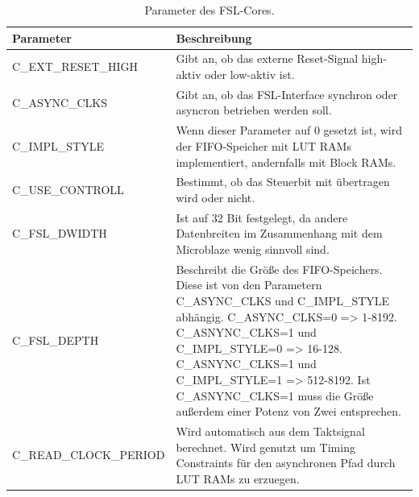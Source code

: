 \begin{table}[ht!]
	\begin{tabular}{|l|p{10cm}|}
		\hline \textbf{Parameter} & \textbf{Beschreibung} \\ 
		\hline C\_EXT\_RESET\_HIGH & Gibt an, ob das externe Reset-Signal high-aktiv oder low-aktiv ist.\\ 
		\hline C\_ASYNC\_CLKS & Gibt an, ob das FSL-Interface synchron oder asyncron betrieben werden soll.\\ 
		\hline C\_IMPL\_STYLE & Wenn dieser Parameter auf 0 gesetzt ist, wird der FIFO-Speicher mit LUT RAMs implementiert, andernfalls mit Block RAMs.   \\ 
		\hline C\_USE\_CONTROLL & Bestimmt, ob das Steuerbit mit übertragen wird oder nicht.\\ 
		\hline C\_FSL\_DWIDTH & Ist auf 32 Bit festgelegt, da andere Datenbreiten im Zusammenhang mit dem Microblaze wenig sinnvoll sind. \\ 
		\hline C\_FSL\_DEPTH & Beschreibt die Größe des FIFO-Speichers. Diese ist von den Parametern C\_ASYNC\_CLKS und C\_IMPL\_STYLE abhängig. C\_ASYNC\_CLKS=0 => 1-8192. C\_ASNYNC\_CLKS=1 und C\_IMPL\_STYLE=0 => 16-128. C\_ASNYNC\_CLKS=1 und C\_IMPL\_STYLE=1 => 512-8192. Ist C\_ASNYNC\_CLKS=1 muss die Größe außerdem einer Potenz von Zwei entsprechen.\\ 
		\hline C\_READ\_CLOCK\_PERIOD & Wird automatisch aus dem Taktsignal berechnet. Wird genutzt um Timing Constraints für den asynchronen Pfad durch LUT RAMs zu erzuegen. \\
		\hline 
	\end{tabular}
	\centering
	\caption{Parameter des FSL-Cores.}
	\label{tab:FSLParam}
\end{table}

